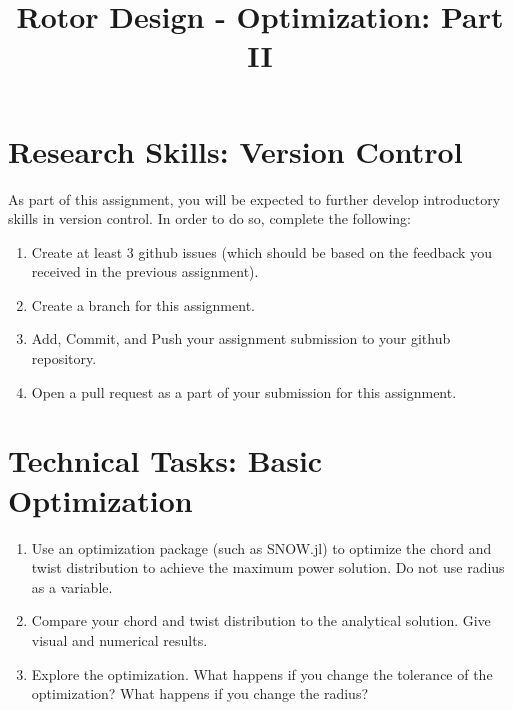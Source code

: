 \documentclass[11pt]{article}
\title{Rotor Design - Optimization: Part II}
\date{}
\begin{document}
	
\maketitle
\vspace{-2cm}

\section{Research Skills: Version Control}

As part of this assignment, you will be expected to further develop introductory skills in version control.
In order to do so, complete the following:
\begin{enumerate}[label=\alph*.]
	\item Create at least 3 github issues (which should be based on the feedback you received in the previous assignment).
	\item Create a branch for this assignment.
	\item Add, Commit, and Push your assignment submission to your github repository.
	\item Open a pull request as a part of your submission for this assignment.
\end{enumerate}

	



\section{Technical Tasks: Basic Optimization}

\begin{enumerate}[label=\alph*.]
	\item Use an optimization package (such as SNOW.jl) to optimize the chord and twist distribution to achieve the maximum power solution. Do not use radius as a variable.
	\item Compare your chord and twist distribution to the analytical solution. Give visual and numerical results.
	\item Explore the optimization. What happens if you change the tolerance of the optimization? What happens if you change the radius?
\end{enumerate}
	
	
\end{document}
